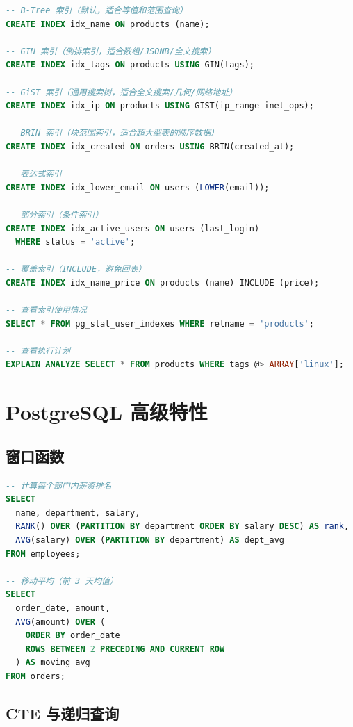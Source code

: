 \documentclass[12pt,UTF8]{ctexbook}
\begin{document}
\begin{lstlisting}[language=sql]
-- B-Tree 索引（默认，适合等值和范围查询）
CREATE INDEX idx_name ON products (name);

-- GIN 索引（倒排索引，适合数组/JSONB/全文搜索）
CREATE INDEX idx_tags ON products USING GIN(tags);

-- GiST 索引（通用搜索树，适合全文搜索/几何/网络地址）
CREATE INDEX idx_ip ON products USING GIST(ip_range inet_ops);

-- BRIN 索引（块范围索引，适合超大型表的顺序数据）
CREATE INDEX idx_created ON orders USING BRIN(created_at);

-- 表达式索引
CREATE INDEX idx_lower_email ON users (LOWER(email));

-- 部分索引（条件索引）
CREATE INDEX idx_active_users ON users (last_login)
  WHERE status = 'active';

-- 覆盖索引（INCLUDE，避免回表）
CREATE INDEX idx_name_price ON products (name) INCLUDE (price);

-- 查看索引使用情况
SELECT * FROM pg_stat_user_indexes WHERE relname = 'products';

-- 查看执行计划
EXPLAIN ANALYZE SELECT * FROM products WHERE tags @> ARRAY['linux'];
\end{lstlisting}

\section{PostgreSQL 高级特性}
\label{sec:postgresql-advanced}

\subsection*{窗口函数}

\begin{lstlisting}[language=sql]
-- 计算每个部门内薪资排名
SELECT 
  name, department, salary,
  RANK() OVER (PARTITION BY department ORDER BY salary DESC) AS rank,
  AVG(salary) OVER (PARTITION BY department) AS dept_avg
FROM employees;

-- 移动平均（前 3 天均值）
SELECT 
  order_date, amount,
  AVG(amount) OVER (
    ORDER BY order_date 
    ROWS BETWEEN 2 PRECEDING AND CURRENT ROW
  ) AS moving_avg
FROM orders;
\end{lstlisting}

\subsection*{CTE 与递归查询}
\end{document}
